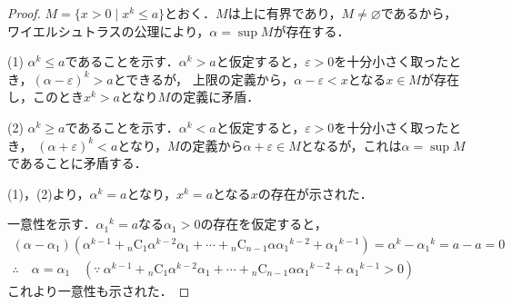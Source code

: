 \documentclass[dvipdfmx,uplatex,11pt]{jsarticle}
\theoremstyle{definition}
\begin{document}
\begin{leftbar}
    \begin{proof}
        $M=\{x>0 \mid x^k \le a\}$とおく．$M$は上に有界であり，$M \ne \varnothing$であるから，ワイエルシュトラスの公理により，$\alpha = \sup M$が存在する．\par 
        (1) \quad $\alpha^k \le a$であることを示す．$\alpha^k >a$と仮定すると，$\varepsilon >0$を十分小さく取ったとき，$(\alpha - \varepsilon)^k >a$とできるが，
        上限の定義から，$\alpha - \varepsilon <x$となる$x \in M$が存在し，このとき$x^k >a$となり$M$の定義に矛盾．\par 
        (2) \quad $ \alpha^k \ge a$であることを示す．$\alpha^k <a$と仮定すると，$\varepsilon>0$を十分小さく取ったとき，
        $(\alpha + \varepsilon)^k<a$となり，$M$の定義から$\alpha + \varepsilon \in M$となるが，これは$\alpha = \sup M$であることに矛盾する．\par 
        (1)，(2)より，$\alpha^k =a$となり，$x^k=a$となる$x$の存在が示された．\par 
        一意性を示す．${\alpha_1}^k =a$なる$\alpha_1>0$の存在を仮定すると，
        \begin{gather*}
            (\alpha - \alpha_1)(\alpha^{k-1}+{}_n \mathrm{C} _1 \alpha^{k-2} \alpha_1 + \cdots +{}_n \mathrm{C} _{n-1} \alpha {\alpha_1}^{k-2} + {\alpha_1}^{k-1})= \alpha^k -{\alpha_1}^k =a-a=0 \\
            \therefore \quad \alpha = \alpha_1 \quad (\because~\alpha^{k-1}+{}_n \mathrm{C} _1 \alpha^{k-2} \alpha_1 + \cdots +{}_n \mathrm{C} _{n-1} \alpha {\alpha_1}^{k-2} + {\alpha_1}^{k-1}>0 )
        \end{gather*}
        これより一意性も示された．
        \end{proof}
    \end{leftbar}
\end{document}
